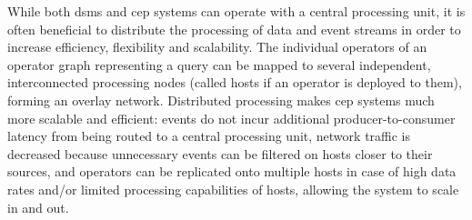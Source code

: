While both \gls{dsms} and \gls{cep} systems can operate with a central processing unit, it is often beneficial to distribute the processing of data and event streams in order to increase efficiency, flexibility and scalability.   
The individual operators of an operator graph representing a query can be mapped to several independent, interconnected processing nodes (called hosts if an operator is deployed to them), forming an overlay network. Distributed processing makes \gls{cep} systems much more scalable and efficient: events do not incur additional producer-to-consumer latency from being routed to a central processing unit, network traffic is decreased because unnecessary events can be filtered on hosts closer to their sources, and operators can be replicated onto multiple hosts in case of high data rates and/or limited processing capabilities of hosts, allowing the system to scale in and out.

